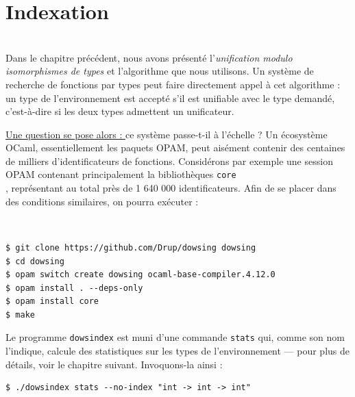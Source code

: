 \documentclass[a4paper]{report}
\theoremstyle{definition}
\newcommand{\dowsindex}{\texttt{dowsindex}\xspace}
\newcommand\gab[1]{{\bf\color{Orange}{TODO: #1}}\\}
\newcommand\reformule[1]{\underline{#1}}
\begin{document}

\chapter {Indexation}

\gab{Pour moi, cette introduction est bien trop longue. Tu essayes de présenter l'outil et de l'utiliser pour justifier le developement, mais ce n'est pas du tout nécéssaire. Si tu voulais le faire, il faudrait une section benchmark plus détaillée. Si tu veux \og teaser\fg ces résultats, tu peux le faire en une phrase, pas plus}

Dans le chapitre précédent, nous avons présenté l'\emph{unification modulo isomorphismes de types} et l'algorithme que nous utilisons. Un système de recherche de fonctions par types peut faire directement appel à cet algorithme : un type de l'environnement est accepté s'il est unifiable avec le type demandé, c'est-à-dire si les deux types admettent un unificateur.

\reformule{Une question se pose alors : }ce système passe-t-il à l'échelle ? Un écosystème OCaml, essentiellement les paquets OPAM, peut aisément contenir des centaines de milliers d'identificateurs de fonctions. Considérons par exemple une session OPAM contenant principalement la bibliothèques \texttt{core}\gab{Un petit lien ici}, représentant au total près de 1 640 000 identificateurs. Afin de se placer dans des conditions similaires, on pourra exécuter :

\gab{Ce bout aurait plus de sens dans la dernière partie}

\begin{verbatim}
$ git clone https://github.com/Drup/dowsing dowsing
$ cd dowsing
$ opam switch create dowsing ocaml-base-compiler.4.12.0
$ opam install . --deps-only
$ opam install core
$ make
\end{verbatim}

Le programme \dowsindex est muni d'une commande \texttt{stats} qui, comme son nom l'indique, calcule des statistiques sur les types de l'environnement — pour plus de détails, voir le chapitre suivant. Invoquons-la ainsi :

\begin{verbatim}
$ ./dowsindex stats --no-index "int -> int -> int"
\end{verbatim}
\gab{Il faut mettre la sortie sur tout les exemples de ligne de commande}
\end{document}
